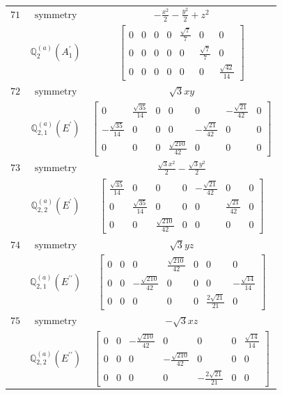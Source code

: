 \documentclass[fleqn,8pt,landscape]{jsarticle}
\begin{document}
\begin{longtable}{ccc}
$ 71 $ & $ \text{symmetry} $ & $ - \frac{x^{2}}{2} - \frac{y^{2}}{2} + z^{2} $ \\
$  $ & $ \mathbb{Q}_{2}^{(a)}(A_{1}^{\prime}) $ & $ \begin{bmatrix} 0 & 0 & 0 & 0 & \frac{\sqrt{7}}{7} & 0 & 0 \\ 0 & 0 & 0 & 0 & 0 & \frac{\sqrt{7}}{7} & 0 \\ 0 & 0 & 0 & 0 & 0 & 0 & \frac{\sqrt{42}}{14} \end{bmatrix} $ \\ \hline
$ 72 $ & $ \text{symmetry} $ & $ \sqrt{3} x y $ \\
$  $ & $ \mathbb{Q}_{2,1}^{(a)}(E^{\prime}) $ & $ \begin{bmatrix} 0 & \frac{\sqrt{35}}{14} & 0 & 0 & 0 & - \frac{\sqrt{21}}{42} & 0 \\ - \frac{\sqrt{35}}{14} & 0 & 0 & 0 & - \frac{\sqrt{21}}{42} & 0 & 0 \\ 0 & 0 & 0 & \frac{\sqrt{210}}{42} & 0 & 0 & 0 \end{bmatrix} $ \\ \hline
$ 73 $ & $ \text{symmetry} $ & $ \frac{\sqrt{3} x^{2}}{2} - \frac{\sqrt{3} y^{2}}{2} $ \\
$  $ & $ \mathbb{Q}_{2,2}^{(a)}(E^{\prime}) $ & $ \begin{bmatrix} \frac{\sqrt{35}}{14} & 0 & 0 & 0 & - \frac{\sqrt{21}}{42} & 0 & 0 \\ 0 & \frac{\sqrt{35}}{14} & 0 & 0 & 0 & \frac{\sqrt{21}}{42} & 0 \\ 0 & 0 & \frac{\sqrt{210}}{42} & 0 & 0 & 0 & 0 \end{bmatrix} $ \\ \hline
$ 74 $ & $ \text{symmetry} $ & $ \sqrt{3} y z $ \\
$  $ & $ \mathbb{Q}_{2,1}^{(a)}(E^{\prime\prime}) $ & $ \begin{bmatrix} 0 & 0 & 0 & \frac{\sqrt{210}}{42} & 0 & 0 & 0 \\ 0 & 0 & - \frac{\sqrt{210}}{42} & 0 & 0 & 0 & - \frac{\sqrt{14}}{14} \\ 0 & 0 & 0 & 0 & 0 & \frac{2 \sqrt{21}}{21} & 0 \end{bmatrix} $ \\ \hline
$ 75 $ & $ \text{symmetry} $ & $ - \sqrt{3} x z $ \\
$  $ & $ \mathbb{Q}_{2,2}^{(a)}(E^{\prime\prime}) $ & $ \begin{bmatrix} 0 & 0 & - \frac{\sqrt{210}}{42} & 0 & 0 & 0 & \frac{\sqrt{14}}{14} \\ 0 & 0 & 0 & - \frac{\sqrt{210}}{42} & 0 & 0 & 0 \\ 0 & 0 & 0 & 0 & - \frac{2 \sqrt{21}}{21} & 0 & 0 \end{bmatrix} $ \\ \hline

\end{longtable}
\end{document}
